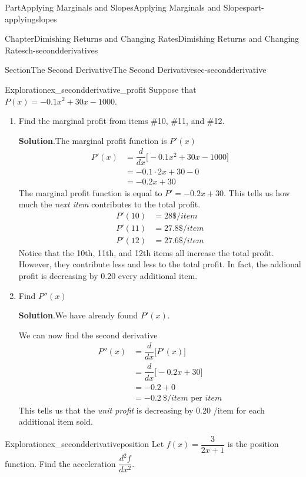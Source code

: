 \documentclass[oneside,10pt,]{tufte-book}
\newcommand{\blocktitlefont}{\relax}
\numberwithin{equation}{chapter}
\newcommand{\ddx}[1]{ \dfrac{d}{dx} \Big[ #1 \Big]  }
\newcommand{\amp}{&}
\begin{document}
\begin{partptx}{Part}{Applying Marginals and Slopes}{}{Applying Marginals and Slopes}{}{}{part-applyingslopes}
\begin{chapterptx}{Chapter}{Dimishing Returns and Changing Rates}{}{Dimishing Returns and Changing Rates}{}{}{ch-secondderivatives}
\begin{sectionptx}{Section}{The Second Derivative}{}{The Second Derivative}{}{}{sec-secondderivative}
%
\begin{exploration}{Exploration}{}{ex_secondderivative_profit}%
Suppose that \(P(x) = -0.1x^2  + 30x - 1000 \).%
\begin{enumerate}[font=\bfseries,label=(\alph*),ref=\alph*]%
\item{}Find the marginal profit from items \#10, \#11, and \#12.%
\par\smallskip%
\noindent\textbf{\blocktitlefont Solution}.\hypertarget{ex_secondderivative_profit-2-2}{}\quad{}The marginal profit function is \(P'(x)\)%
\begin{align*}
P'(x) \amp = \ddx{-0.1x^2  + 30x - 1000 }\\
\amp =-0.1\cdot 2x + 30 - 0 \\
\amp = -0.2 x + 30
\end{align*}
The marginal profit function is equal to \(P' = -0.2 x + 30 \). This tells us how much the \emph{next item} contributes to the total profit.%
\begin{align*}
P'(10) \amp = 28 \$/item \\
P'(11) \amp = 27.8 \$/item \\
P'(12) \amp = 27.6 \$/item 
\end{align*}
Notice that the 10th, 11th, and 12th items all increase the total profit. However, they contribute less and less to the total profit. In fact, the addional profit is decreasing by \textdollar{}0.20 every additional item.%
\item{}Find \(P''(x)\)%
\par\smallskip%
\noindent\textbf{\blocktitlefont Solution}.\hypertarget{ex_secondderivative_profit-3-2}{}\quad{}We have already found \(P'(x)\).%
\par
We can now find the second derivative%
\begin{align*}
P''(x) \amp = \ddx{ P'(x) } \\
\amp = \ddx{ -0.2 x + 30 } \\
\amp = -0.2 + 0 \\
\amp = -0.2 \ \$/item\text{ per } item 
\end{align*}
This tells us that the \emph{unit profit} is decreasing by \textdollar{}0.20 \textdollar{}\slash{}item for each additional item sold.%
\end{enumerate}%
\end{exploration}%
\begin{exploration}{Exploration}{}{ex_secondderivativeposition}%
Let \(f(x) = \dfrac{3}{2x+1}\) is the position function. Find the acceleration \(\dfrac{d^2f}{dx^2}\).%

\end{exploration}
\end{sectionptx}
\end{chapterptx}
\end{partptx}
\end{document}
